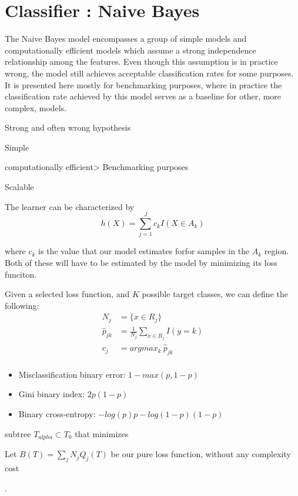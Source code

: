 \section{Classifier : Naive Bayes}

The Naive Bayes model encompasses a group of simple models and computationally efficient models which assume a strong independence relationship among the features. Even though this assumption is in practice wrong, the model still achieves acceptable classification rates for some purposes. It is presented here mostly for benchmarking purposes, where in practice the classification rate achieved by this model serves as a baseline for other, more complex, models.

Strong and often wrong hypothesis

Simple

computationally efficient> Benchmarking purposes

Scalable




The learner can be characterized by 
\[
h(X) = \sum_{j=1}^J c_k I(X \in A_k)
\]\label{equation-decisionTreeModel}

where $c_k$ is the value that our model estimates forfor samples in the $A_k$ region. Both of these will have to be estimated by the model by minimizing its loss funciton.


Given a selected loss function, and $K$ possible target classes, we can define the following:
\begin{equation}
\begin{split}
N_j & =  \{x \in R_j \}\\
\hat{p}_{jk} & = \frac{1}{N_j} \sum_{x \in R_j}  I(y=k)\\
c_j & =  argmax_{k} \  \hat{p}_{jk} \\
\end{split}
\end{equation}\label{decisionTreePruneParameters}


\begin{itemize}
	\item Misclassification binary error: $1 - max(p, 1-p)$
	\item Gini binary index: $ 2p(1-p) $
	\item Binary cross-entropy: $ -log(p)p - log(1- p)(1-p) $
\end{itemize}\label{decisionTreeCostFunctions}

 subtree $T_{alpha} \subset T_0$ that minimizes

Let  $B(T)  = \sum_{j} N_j Q_j(T) $ be our pure loss function, without any complexity cost

 \cite{breiman-cart84}.


\textit{}

\textit{}

\textit{}

